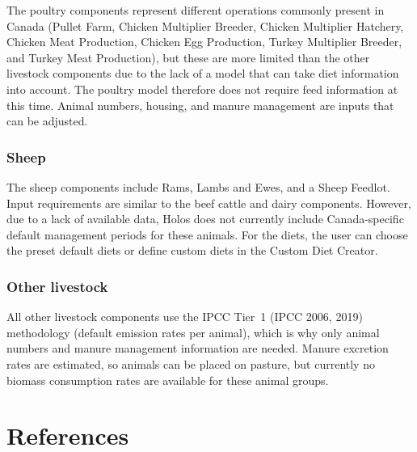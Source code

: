 The poultry components represent different operations commonly present in Canada
(Pullet Farm, Chicken Multiplier Breeder, Chicken Multiplier Hatchery, Chicken
Meat Production, Chicken Egg Production, Turkey Multiplier Breeder, and Turkey
Meat Production), but these are more limited than the other livestock components
due to the lack of a model that can take diet information into account. The
poultry model therefore does not require feed information at this time. Animal
numbers, housing, and manure management are inputs that can be adjusted.

\subsubsection{Sheep}

The sheep components include Rams, Lambs and Ewes, and a Sheep Feedlot. Input
requirements are similar to the beef cattle and dairy components. However, due
to a lack of available data, Holos does not currently include Canada-specific
default management periods for these animals. For the diets, the user can choose
the preset default diets or define custom diets in the Custom Diet Creator.

\subsubsection{Other livestock}

All other livestock components use the IPCC Tier~1 (IPCC 2006, 2019)
methodology (default emission rates per animal), which is why only animal
numbers and manure management information are needed. Manure excretion rates are
estimated, so animals can be placed on pasture, but currently no biomass
consumption rates are available for these animal groups.

\section{References}
\label{sec:references}


